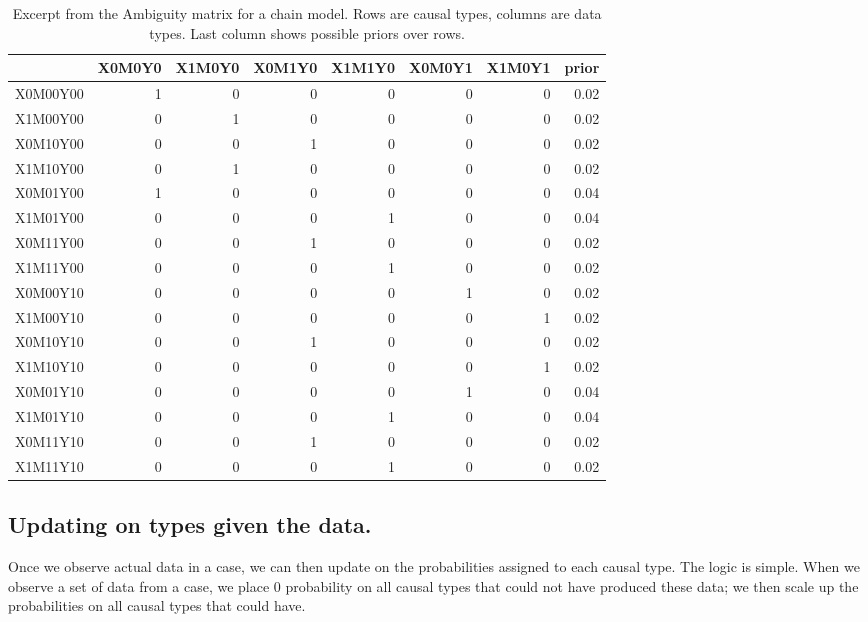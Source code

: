 \documentclass[
  12pt,
]{book}
\begin{document}
\begin{table}

\caption{\label{tab:ambigmatrixmed}Excerpt from the Ambiguity matrix for a chain model. Rows are causal types, columns are data types. Last column shows possible priors over rows.}
\centering
\begin{tabular}[t]{l|r|r|r|r|r|r|r}
\hline
  & X0M0Y0 & X1M0Y0 & X0M1Y0 & X1M1Y0 & X0M0Y1 & X1M0Y1 & prior\\
\hline
X0M00Y00 & 1 & 0 & 0 & 0 & 0 & 0 & 0.02\\
\hline
X1M00Y00 & 0 & 1 & 0 & 0 & 0 & 0 & 0.02\\
\hline
X0M10Y00 & 0 & 0 & 1 & 0 & 0 & 0 & 0.02\\
\hline
X1M10Y00 & 0 & 1 & 0 & 0 & 0 & 0 & 0.02\\
\hline
X0M01Y00 & 1 & 0 & 0 & 0 & 0 & 0 & 0.04\\
\hline
X1M01Y00 & 0 & 0 & 0 & 1 & 0 & 0 & 0.04\\
\hline
X0M11Y00 & 0 & 0 & 1 & 0 & 0 & 0 & 0.02\\
\hline
X1M11Y00 & 0 & 0 & 0 & 1 & 0 & 0 & 0.02\\
\hline
X0M00Y10 & 0 & 0 & 0 & 0 & 1 & 0 & 0.02\\
\hline
X1M00Y10 & 0 & 0 & 0 & 0 & 0 & 1 & 0.02\\
\hline
X0M10Y10 & 0 & 0 & 1 & 0 & 0 & 0 & 0.02\\
\hline
X1M10Y10 & 0 & 0 & 0 & 0 & 0 & 1 & 0.02\\
\hline
X0M01Y10 & 0 & 0 & 0 & 0 & 1 & 0 & 0.04\\
\hline
X1M01Y10 & 0 & 0 & 0 & 1 & 0 & 0 & 0.04\\
\hline
X0M11Y10 & 0 & 0 & 1 & 0 & 0 & 0 & 0.02\\
\hline
X1M11Y10 & 0 & 0 & 0 & 1 & 0 & 0 & 0.02\\
\hline
\end{tabular}
\end{table}

\hypertarget{updating-on-types-given-the-data.}{%
\subsection{Updating on types given the data.}\label{updating-on-types-given-the-data.}}

Once we observe actual data in a case, we can then update on the probabilities assigned to each causal type. The logic is simple. When we observe a set of data from a case, we place \(0\) probability on all causal types that could not have produced these data; we then scale up the probabilities on all causal types that could have.
\end{document}
